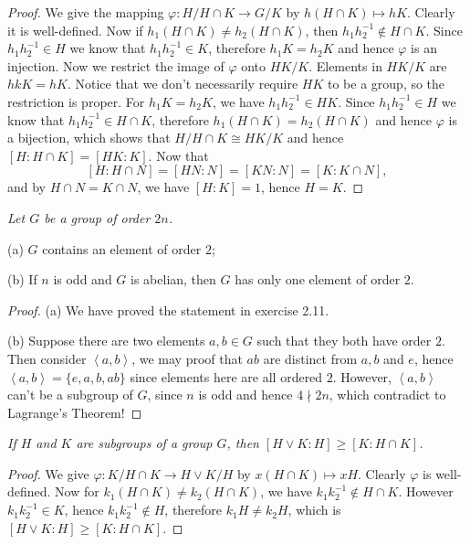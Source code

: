 \begin{proof}
We give the mapping $\varphi:H/H\cap K\to G/K$ by $h(H\cap K)\mapsto hK$. Clearly it is well-defined. Now if $h_1(H\cap K)\ne h_2(H\cap K)$, then $h_1h_2^{-1}\notin H\cap K$. Since $h_1h_2^{-1}\in H$ we know that $h_1h_2^{-1}\in K$, therefore $h_1K=h_2K$ and hence $\varphi$ is an injection. Now we restrict the image of $\varphi$ onto $HK/K$. Elements in $HK/K$ are $hkK=hK$. Notice that we don't necessarily require $HK$ to be a group, so the restriction is proper. For $h_1K=h_2K$, we have $h_1h_2^{-1}\in HK$. Since $h_1h_2^{-1}\in H$ we know that $h_1h_2^{-1}\in H\cap K$, therefore $h_1(H\cap K)=h_2(H\cap K)$ and hence $\varphi$ is a bijection, which shows that $H/H\cap K\cong HK/K$ and hence $[H:H\cap K]=[HK:K]$. Now that 
$$
\left[ H:H\cap N \right] =\left[ HN:N \right] =\left[ KN:N \right] =\left[ K:K\cap N \right] ,
$$
and by $H\cap N=K\cap N$, we have $[H:K]=1$, hence $H=K$.
\end{proof}
\begin{problem}\em
Let $G$ be a group of order $2n$.\par
(a) $G$ contains an element of order $2$;\par
(b) If $n$ is odd and $G$ is abelian, then $G$ has only one element of order $2$.
\end{problem}
\begin{proof}
(a) We have proved the statement in exercise 2.11.\par
(b) Suppose there are two elements $a,b\in G$ such that they both have order $2$. Then consider $\left<a,b\right>$, we may proof that $ab$ are distinct from $a,b$ and $e$, hence $\left<a,b\right>=\{e,a,b,ab\}$ since elements here are all ordered $2$. However, $\left<a,b\right>$ can't be a subgroup of $G$, since $n$ is odd and hence $4\nmid 2n$, which contradict to Lagrange's Theorem!
\end{proof}
\begin{problem}\em
If $H$ and $K$ are subgroups of a group $G$, then $[H\vee K:H]\geq [K:H\cap K]$. 
\end{problem}
\begin{proof}
We give $\varphi :K/H\cap K\rightarrow H\lor K/H$ by $x\left( H\cap K \right) \mapsto xH$. Clearly $\varphi$ is well-defined. Now for $k_1\left( H\cap K \right) \ne k_2\left( H\cap K \right) $, we have $k_1k_2^{-1}\notin H\cap K$. However $k_1k_2^{-1}\in K$, hence $k_1k_2^{-1}\notin H$, therefore $k_1H\ne k_2H$, which is $[H\vee K:H]\geq [K:H\cap K]$.
\end{proof}
